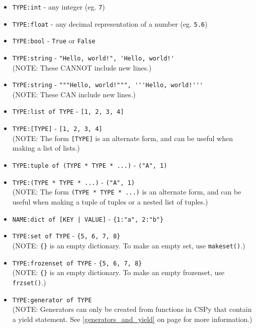\documentclass{article}
\begin{document}
\begin{itemize}
\item \verb|TYPE:int| - any integer (eg. \verb|7|) 

\item \verb|TYPE:float| - any decimal representation of a number (eg. \verb|5.6|) 

\item \verb|TYPE:bool| - \verb|True| or \verb|False| 

\item \verb|TYPE:string| - 
\verb|"Hello, world!", 'Hello, world!'| \\ (NOTE: These CANNOT include new lines.) 

\item \verb|TYPE:string| - 
\verb|"""Hello, world!""", '''Hello, world!'''| \\ (NOTE: These CAN include new lines.) 

\item \verb|TYPE:list of TYPE| - \verb|[1, 2, 3, 4]| 

\item \verb|TYPE:[TYPE]| - \verb|[1, 2, 3, 4]| \\ (NOTE: The form \verb|[TYPE]| is an alternate form, and can be useful when making a list of lists.) 

\item \verb|TYPE:tuple of (TYPE * TYPE * ...)| - \verb|("A", 1)| 

\item \verb|TYPE:(TYPE * TYPE * ...)| - \verb|("A", 1)| \\
(NOTE: The form \verb|(TYPE * TYPE * ...)| is an alternate form, and can be useful when making a tuple of tuples or a nested list of tuples.) 
\item \verb!NAME:dict of [KEY | VALUE]! - \verb|{1:"a", 2:"b"}| 

\item \verb|TYPE:set of TYPE| - \verb|{5, 6, 7, 8}| \\
(NOTE: \verb|{}| is an empty dictionary. To make an empty set, use \verb|makeset()|.)

\item \verb|TYPE:frozenset of TYPE| - \verb|{5, 6, 7, 8}| \\ 
(NOTE: \verb|{}| is an empty dictionary. To make an empty frozenset, use \verb|frzset()|.)

\item \verb|TYPE:generator of TYPE| \\
(NOTE: Generators can only be created from functions in CSPy that contain a yield statement. See \ref{generators_and_yield} on page \pageref{generators_and_yield} for more information.)


\end{itemize}
\end{document}
